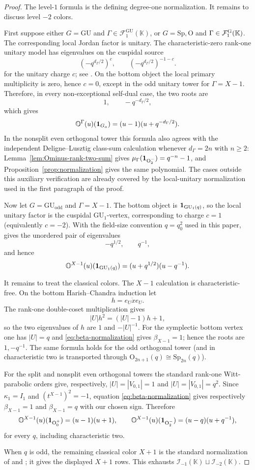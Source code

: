 \documentclass[12pt]{amsart}
\numberwithin{itemcounter}{subsection}
\theoremstyle{plain}
\theoremstyle{definition}
\theoremstyle{remark}
\numberwithin{equation}{section}
\def\bbK{\mathbb{K}}
\def\bbO{\mathbb{O}}
\def\calF{\mathcal{F}}
\def\calI{\mathcal{I}}
\def\O{\mathrm{O}}
\def\Sp{\mathrm{Sp}}
\def\GU{\mathrm{GU}}
\begin{document}
\begin{proof}
The level-$1$ formula is the defining degree-one normalization.  It remains
to discuss level $-2$ colors.

First suppose either $G=\GU$ and $\Gamma\in\calF_1^{\GU}(\bbK)$, or $G=\Sp,\O$ and $\Gamma\in\calF_1^{\rm G}(\bbK)$.  The corresponding local Jordan factor is unitary.  The characteristic-zero rank-one unitary model has
eigenvalues on the cuspidal source
\[
 (-q^{d_\Gamma/2})^c,\qquad (-q^{d_\Gamma/2})^{-1-c}.
\]
for the unitary charge $c$; see \cite[Theorem~4.12]{DVV19}.  On the bottom
object the local primary multiplicity is zero, hence $c=0$, except in the
odd unitary tower for $\Gamma=X-1$.  Therefore, in every non-exceptional
self-dual case, the two roots are
\[
 1,\qquad -q^{-d_\Gamma/2},
\]
which gives
\[
 \bbO^\Gamma(u)({\bf1}_{G_a})
 =(u-1)(u+q^{-d_\Gamma/2}).
\]
In the nonsplit even orthogonal tower this formula also agrees with the
independent Deligne--Lusztig class-sum calculation whenever
$d_\Gamma=2n$ with $n\ge2$: Lemma~\ref{lem:Ominus-rank-two-sum}
gives \(\mu_\Gamma({\bf1}_{\O^-_2})=q^{-n}-1\), and
Proposition~\ref{prop:normalization} gives the same polynomial.  The cases
outside this auxiliary verification are already covered by the local-unitary
normalization used in the first paragraph of the proof.

Now let $G=\GU_{\mathrm{odd}}$ and $\Gamma=X-1$.  The bottom object is
${\bf1}_{\GU_1(q)}$, so the local unitary factor is the cuspidal
$\GU_1$-vertex, corresponding to charge $c=1$ (equivalently $c=-2$).
With the field-size convention $q=q_0^2$ used in this paper, \cite[Theorem~4.12]{DVV19} gives the unordered pair of eigenvalues
\[
 -q^{1/2},\qquad q^{-1},
\]
and hence
\[
 \bbO^{X-1}(u)({\bf1}_{\GU_1(q)})
 =(u+q^{1/2})(u-q^{-1}).
\]

It remains to treat the classical colors.  The $X-1$ calculation is
characteristic-free.  On the bottom Harish--Chandra induction let
\[
 h=e_U\dot x e_U.
\]
The rank-one double-coset multiplication gives
\[
 |U|h^2=(|U|-1)h+1,
\]
so the two eigenvalues of $h$ are $1$ and $-|U|^{-1}$.  For the
symplectic bottom vertex one has $|U|=q$ and
\eqref{eq:beta-normalization} gives $\beta_{X-1}=1$; hence the roots are
$1,-q^{-1}$.  The same formula holds for the odd orthogonal tower (and in
characteristic two is transported through
$\O_{2n+1}(q)\cong\Sp_{2n}(q)$).

For the split and nonsplit even orthogonal towers the standard rank-one
Witt-parabolic orders give, respectively,
$|U|=|V_{0,1}|=1$ and $|U|=|V_{0,1}|=q^2$.  Since
$\kappa_1=I_1$ and
$(t^{X-1})^2=-1$, equation \eqref{eq:beta-normalization} gives respectively
$\beta_{X-1}=1$ and $\beta_{X-1}=q$ with our chosen sign.  Therefore
\[
 \bbO^{X-1}(u)({\bf1}_{\O^+_0})=(u-1)(u+1),
 \qquad
 \bbO^{X-1}(u)({\bf1}_{\O^-_2})=(u-q)(u+q^{-1}),
\]
for every $q$, including characteristic two.

When $q$ is odd, the remaining classical color $X+1$ is the standard
normalization of \cite[Theorem~6.5]{DVV17} and
\cite[Lemmas~4.6--4.7 and Corollary~4.8]{LSZ25}; it gives the displayed
$X+1$ rows.  This exhausts
$\calI_{-1}(\bbK)\sqcup\calI_{-2}(\bbK)$.
\end{proof}
\end{document}
